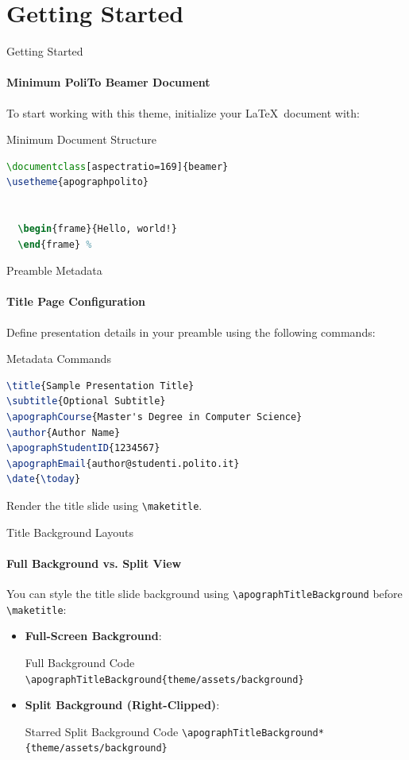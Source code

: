 
\section{Getting Started}

\begin{frame}[fragile]{Getting Started}
\framesubtitle{Minimum PoliTo Beamer Document}
To start working with this theme, initialize your \LaTeX\ document with:
\begin{block}{Minimum Document Structure}
\begin{lstlisting}[language=TeX]
\documentclass[aspectratio=169]{beamer}
\usetheme{apographpolito}


  \begin{frame}{Hello, world!}
  \end{frame} %

\end{lstlisting}
\end{block}
\end{frame}

\begin{frame}[fragile]{Preamble Metadata}
\framesubtitle{Title Page Configuration}
Define presentation details in your preamble using the following commands:
\begin{block}{Metadata Commands}
\begin{lstlisting}[language=TeX]
\title{Sample Presentation Title}
\subtitle{Optional Subtitle}
\apographCourse{Master's Degree in Computer Science}
\author{Author Name}
\apographStudentID{1234567}
\apographEmail{author@studenti.polito.it}
\date{\today}
\end{lstlisting}
\end{block}
Render the title slide using \verb|\maketitle|.
\end{frame}

\begin{frame}[fragile]{Title Background Layouts}
\framesubtitle{Full Background vs. Split View}
You can style the title slide background using \verb|\apographTitleBackground| before \verb|\maketitle|:
\begin{itemize}
    \item \textbf{Full-Screen Background}:
    \begin{block}{Full Background Code}
    \verb|\apographTitleBackground{theme/assets/background}|
    \end{block}
    \item \textbf{Split Background (Right-Clipped)}:
    \begin{block}{Starred Split Background Code}
    \verb|\apographTitleBackground*{theme/assets/background}|
    \end{block}
\end{itemize}
\end{frame}
